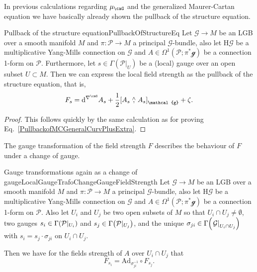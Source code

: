 \documentclass[reqno,a4paper,oneside]{amsart}
\newcommand\mutot{\mu_\caG}
\theoremstyle{plain}
\theoremstyle{remark}
\theoremstyle{definition}
\begin{document}
In previous calculations regarding $\mutot$ and the generalized Maurer-Cartan equation we have basically already shown the pullback of the structure equation.

\begin{corollaries}{Pullback of the structure equation}{PullbackOfStructureEq}
Let $\mathcal{G} \to M$ be an LGB over a smooth manifold $M$ and $\pi\colon\mathcal{P} \to M$ a principal $\mathcal{G}$-bundle, also let $\mathrm{H}\mathcal{G}$ be a multiplicative Yang-Mills connection on $\mathcal{G}$ and $A \in \Omega^1(\mathcal{P}; \pi^*\mathcal{g})$ be a connection 1-form on $\mathcal{P}$. Furthermore, let $s \in \Gamma(\mathcal{P}|_U)$ be a (local) gauge over an open subset $U \subset M$. Then we can express the local field strength as the pullback of the structure equation, that is,
\begin{equation*}
F_s
=
\mathrm{d}^{\nabla^\caG}A_s
	+ \frac{1}{2} \mleft[ A_s \stackrel{\wedge}{,} A_s \mright]_{\mathcal{g}}
	+ \zeta.
\end{equation*}
\end{corollaries}

\begin{proof}
\leavevmode\newline
This follows quickly by the same calculation as for proving Eq.\ \eqref{PullbackofMCGeneralCurvPlusExtra}.
\end{proof}

The gauge transformation of the field strength $F$ describes the behaviour of $F$ under a change of gauge.

\begin{propositions}{Gauge transformations again as a change of gauge}{LocalGaugeTrafoChangeGaugeFieldStrength}
Let $\mathcal{G} \to M$ be an LGB over a smooth manifold $M$ and $\pi\colon\mathcal{P} \to M$ a principal $\mathcal{G}$-bundle, also let $\mathrm{H}\mathcal{G}$ be a multiplicative Yang-Mills connection on $\mathcal{G}$ and $A \in \Omega^1(\mathcal{P}; \pi^*\mathcal{g})$ be a connection 1-form on $\mathcal{P}$. Also let $U_i$ and $U_j$ be two open subsets of $M$ so that $U_i \cap U_j \neq \emptyset$, two gauges $s_i \in \Gamma\mleft(\mathcal{P}|_{U_i}\mright)$ and $s_j \in \Gamma\mleft(\mathcal{P}|_{U_j}\mright)$, and the unique $\sigma_{ji} \in \Gamma\mleft( \mleft.\mathcal{G}\mright|_{U_i \cap U_j} \mright)$ with $s_i = s_j \cdot \sigma_{ji}$ on $U_i \cap U_j$.

Then we have for the fields strength of $A$ over $U_i \cap U_j$ that
\begin{equation*}
F_{s_i}
=
\mathrm{Ad}_{\sigma_{ji}^{-1}}\circ F_{s_j}.
\end{equation*}
\end{propositions}
\end{document}
